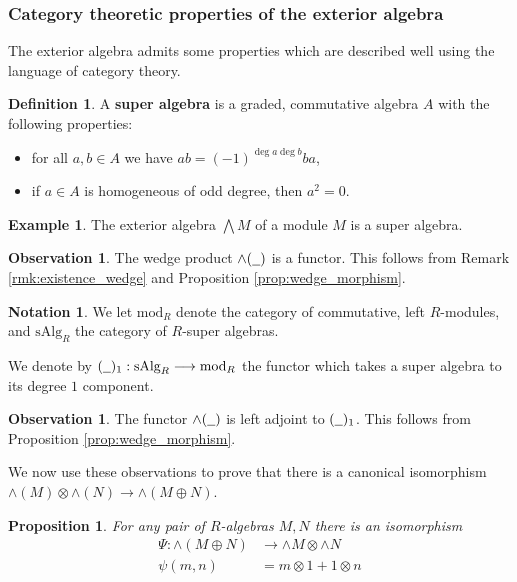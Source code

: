\documentclass[12pt]{article}
\theoremstyle{plain}
\newtheorem{proposition}[thm]{Proposition}
\theoremstyle{definition}
\newtheorem{defn}[thm]{Definition} %
\newtheorem{notation}[thm]{Notation}
\newtheorem{example}[thm]{Example}
\newtheorem{observation}[thm]{Observation}
\newcommand{\und}[1]{\underline{\hspace{#1 cm}}}
\newcommand{\lto}{\longrightarrow}
\begin{document}
\subsubsection{Category theoretic properties of the exterior algebra}
The exterior algebra admits some properties which are described well using the language of category theory.
\begin{defn}
	A \textbf{super algebra} is a graded, commutative algebra $A$ with the following properties:
	\begin{itemize}
		\item for all $a,b \in A$ we have $ab = (-1)^{\operatorname{deg}a\operatorname{deg}b}ba$,
		\item if $a \in A$ is homogeneous of odd degree, then $a^2 = 0$.
	\end{itemize}
\end{defn}
\begin{example}
	The exterior algebra $\bigwedge M$ of a module $M$ is a super algebra.
\end{example}
\begin{observation}
	The wedge product $\wedge(\und{0.2})$ is a functor. This follows from Remark \ref{rmk:existence_wedge} and Proposition \ref{prop:wedge_morphism}.
\end{observation}
\begin{notation}
	We let $\text{mod}_R$ denote the category of commutative, left $R$-modules, and $\text{sAlg}_R$ the category of $R$-super algebras.
	
	We denote by $(\und{0.2})_1: \text{sAlg}_R \lto \text{mod}_R$ the functor which takes a super algebra to its degree $1$ component.
\end{notation}
\begin{observation}\label{obs:wedge_adjunction}
	The functor $\wedge(\und{0.2})$ is left adjoint to $(\und{0.2})_1$. This follows from Proposition \ref{prop:wedge_morphism}.
\end{observation}
We now use these observations to prove that there is a canonical isomorphism $\wedge(M) \otimes \wedge(N) \lto \wedge(M \oplus N)$.
\begin{proposition}\label{prop:sum_tensor_wedge}
	For any pair of $R$-algebras $M,N$ there is an isomorphism
	\begin{align*}
		\Psi: \wedge ( M \oplus N ) &\lto \wedge M \otimes \wedge N\\
		\psi(m, n) &= m \otimes 1 + 1 \otimes n
	\end{align*}
\end{proposition}
\end{document}
